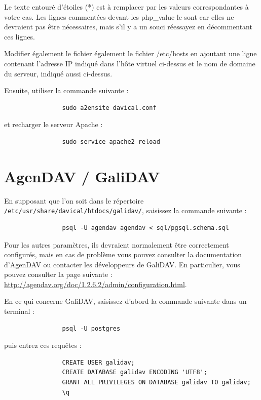 \documentclass[a4paper, 11pt]{report}
\begin{document}
			Le texte entouré d’étoiles (*) est à remplacer par les valeurs correspondantes à votre cas. Les lignes commentées devant les php\_value le sont car elles ne devraient pas être nécessaires, mais s’il y a un souci réessayez en décommentant ces lignes.

			Modifier également le fichier également le fichier /etc/hosts en ajoutant une ligne contenant l’adresse IP indiqué dans l’hôte virtuel ci-dessus et le nom de domaine du serveur, indiqué aussi ci-dessus.

			Ensuite, utiliser la commande suivante :
			\begin{verbatim}
				sudo a2ensite davical.conf
			\end{verbatim}

			et recharger le serveur Apache :
			\begin{verbatim}
				sudo service apache2 reload
			\end{verbatim}

		\section{AgenDAV / GaliDAV}
			En supposant que l’on soit dans le répertoire \texttt{/etc/usr/share/davical/htdocs/galidav/}, saisissez la commande suivante :

			\begin{verbatim}
				psql -U agendav agendav < sql/pgsql.schema.sql
			\end{verbatim}
			Pour les autres paramètres, ils devraient normalement être correctement configurés, mais en cas de problème vous pouvez consulter la documentation d’AgenDAV ou contacter les développeurs de GaliDAV. En particulier, vous pouvez consulter la page suivante : \url{http://agendav.org/doc/1.2.6.2/admin/configuration.html}.

			En ce qui concerne GaliDAV, saisissez d’abord la commande suivante dans un terminal :
			\begin{verbatim}
				psql -U postgres
			\end{verbatim}

			puis entrez ces requêtes :
			\begin{verbatim}
				CREATE USER galidav;
				CREATE DATABASE galidav ENCODING 'UTF8';
				GRANT ALL PRIVILEGES ON DATABASE galidav TO galidav;
				\q
			\end{verbatim}
\end{document}
